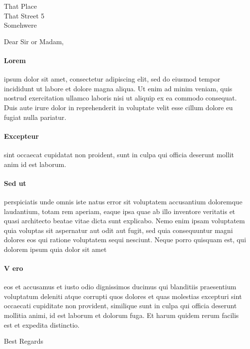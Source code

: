 \documentclass[nocolors,noadress]{friggeri-txt}
\begin{document}

\begin{letter}{ %
That Place \\
That Street 5 \\
Somehwere}

\opening{Dear Sir or Madam,}
\paragraph{Lorem}{ipsum dolor sit amet, consectetur adipiscing elit, sed do eiusmod tempor incididunt ut labore et dolore magna aliqua. Ut enim ad minim veniam, quis nostrud exercitation ullamco laboris nisi ut aliquip ex ea commodo consequat. Duis aute irure dolor in reprehenderit in voluptate velit esse cillum dolore eu fugiat nulla pariatur.}\\[6pt]
\paragraph{Excepteur}{sint occaecat cupidatat non proident, sunt in culpa qui officia deserunt mollit anim id est laborum.}\\[6pt]
\paragraph{Sed ut}{perspiciatis unde omnis iste natus error sit voluptatem accusantium doloremque laudantium, totam rem aperiam, eaque ipsa quae ab illo inventore veritatis et quasi architecto beatae vitae dicta sunt explicabo. Nemo enim ipsam voluptatem quia voluptas sit aspernatur aut odit aut fugit, sed quia consequuntur magni dolores eos qui ratione voluptatem sequi nesciunt. Neque porro quisquam est, qui dolorem ipsum quia dolor sit amet}\\[6pt]
\paragraph{V ero }{eos et accusamus et iusto odio dignissimos ducimus qui blanditiis praesentium voluptatum deleniti atque corrupti quos dolores et quas molestias excepturi sint occaecati cupiditate non provident, similique sunt in culpa qui officia deserunt mollitia animi, id est laborum et dolorum fuga. Et harum quidem rerum facilis est et expedita distinctio. }

Best Regards\\
\vspace*{-40pt}
\end{letter}
\end{document}
